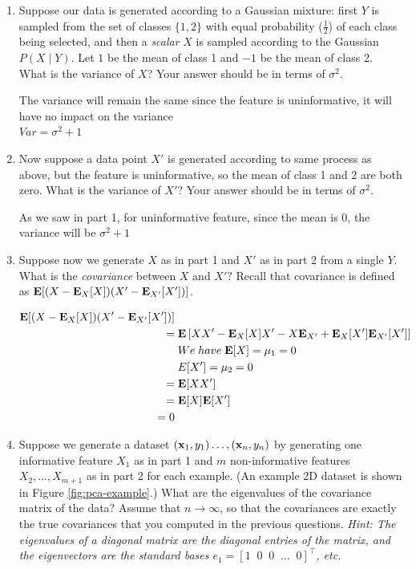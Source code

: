 \begin{enumerate}
\item {} Suppose our data is generated according to a Gaussian
  mixture: first $Y$ is sampled from the set of classes $\{1, 2\}$
  with equal probability ($\frac{1}{2}$) of each class being selected,
  and then a {\em scalar} $X$ is sampled according to the Gaussian
  $P(X \mid Y)$. Let $1$ be the mean of class 1 and $-1$ be the mean
  of class 2.  What is the variance of $X$? Your answer should be in
  terms of $\sigma^2$.

The variance will remain the same since the feature is uninformative, it will have no impact on the variance \\
$Var =\sigma^2 + 1$ \\

\item {} Now suppose a data point $X'$ is generated according
  to same process as above, but the feature is uninformative, so the
  mean of class 1 and 2 are both zero.  What is the variance of $X'$?
  Your answer should be in terms of $\sigma^2$.

As we saw in part 1, for uninformative feature, since the mean is 0, the variance will be $\sigma^2 +1$ \\

\item {} Suppose now we generate $X$ as in part 1 and $X'$ as
  in part 2 from a single $Y$. What is the {\em covariance} between
  $X$ and $X'?$ Recall that covariance is defined as $\mathbf{E}[
    (X-\mathbf{E}_X[X])(X'-\mathbf{E}_{X'}[X']) ]$.

\begin{align*}
	\mathbf{E}[(X-\mathbf{E}_X[X])(X'-\mathbf{E}_{X'}[X']) ] \\
	=&\;  \mathbf{E} \left[ X X' - \mathbf{E}_X [X] X' - X \mathbf{E}_{X'} + \mathbf{E}_X[X'] \mathbf{E}_{X'}[X'] \right] \\
	&\; We \; have \; \mathbf{E}[X] = \mu_1 = 0 \\
	&\; E[X'] = \mu_2 = 0 \\
	=&\; \mathbf{E} [X X'] \\
	=&\; \mathbf{E} [X] \mathbf{E}[X'] \\
	= 0 \\
\end{align*}

\item {} Suppose we generate a dataset $(\mathbf{x}_1,y_1) \dots,
  (\mathbf{x}_n,y_n)$ by generating one informative feature $X_1$ as in part
  1 and $m$ non-informative features $X_2, \dots, X_{m+1}$ as in part
  2 for each example. (An example 2D dataset is shown in Figure
  \ref{fig:pca-example}.) What are the eigenvalues of the covariance
  matrix of the data? Assume that $n \rightarrow \infty$, so that the
  covariances are exactly the true covariances that you computed in
  the previous questions.  {\em Hint: The eigenvalues of a diagonal
    matrix are the diagonal entries of the matrix, and the
    eigenvectors are the standard bases $e_1 = [1 \;\; 0 \;\; 0 \;\;
      \dots \;\; 0]^\top$, etc.}


\end{enumerate}
